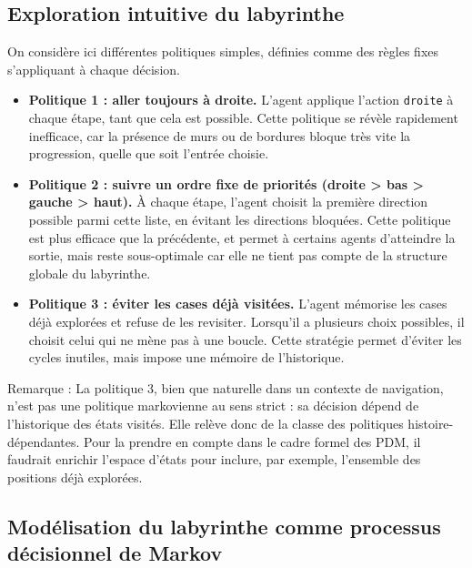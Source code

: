 \documentclass[12pt]{article}
\begin{document}
\subsection{Exploration intuitive du labyrinthe}

On considère ici différentes politiques simples, définies comme des règles fixes s’appliquant à chaque décision.

\begin{itemize}
    \item \textbf{Politique 1 : aller toujours à droite.}  
    L’agent applique l’action \texttt{droite} à chaque étape, tant que cela est possible. Cette politique se révèle rapidement inefficace, car la présence de murs ou de bordures bloque très vite la progression, quelle que soit l’entrée choisie.
\vspace{0.5em}
    \item \textbf{Politique 2 : suivre un ordre fixe de priorités (droite > bas > gauche > haut).}  
    À chaque étape, l’agent choisit la première direction possible parmi cette liste, en évitant les directions bloquées. Cette politique est plus efficace que la précédente, et permet à certains agents d’atteindre la sortie, mais reste sous-optimale car elle ne tient pas compte de la structure globale du labyrinthe.
\vspace{0.5em}
    \item \textbf{Politique 3 : éviter les cases déjà visitées.}  
    L’agent mémorise les cases déjà explorées et refuse de les revisiter. Lorsqu’il a plusieurs choix possibles, il choisit celui qui ne mène pas à une boucle. Cette stratégie permet d’éviter les cycles inutiles, mais impose une mémoire de l’historique.
\end{itemize}

\vspace{0.5em}

Remarque :
La politique 3, bien que naturelle dans un contexte de navigation, n’est pas une politique markovienne au sens strict : sa décision dépend de l’historique des états visités. Elle relève donc de la classe des politiques histoire-dépendantes. Pour la prendre en compte dans le cadre formel des PDM, il faudrait enrichir l’espace d’états pour inclure, par exemple, l’ensemble des positions déjà explorées.

\subsection{Modélisation du labyrinthe comme processus décisionnel de Markov}
\end{document}
